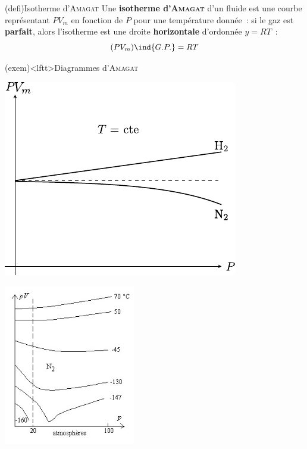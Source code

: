 \documentclass[../../main/main.tex]{subfiles}
\begin{document}
\begin{tcb}(defi){Isotherme d'\textsc{Amagat}}
	Une \textbf{isotherme d'\textsc{Amagat}} d'un fluide est une courbe
	représentant $PV_m$ en fonction de $P$ pour une température donnée~: si le gaz
	est \textbf{parfait}, alors l'isotherme est une droite \textbf{horizontale}
	d'ordonnée $y = RT$~:
	\[
		(PV_m)\ind{G.P.} = RT
	\]
\end{tcb}

\begin{tcb}[sidebyside](exem)<lftt>{Diagrammes d'\textsc{Amagat}}
	\begin{center}
		\includegraphics[width=.8\linewidth]{amagat_deuxgaz}
	\end{center}
	\tcblower
	\begin{center}
		\includegraphics[width=.8\linewidth]{amagat_n2}
	\end{center}
\end{tcb}
\end{document}
